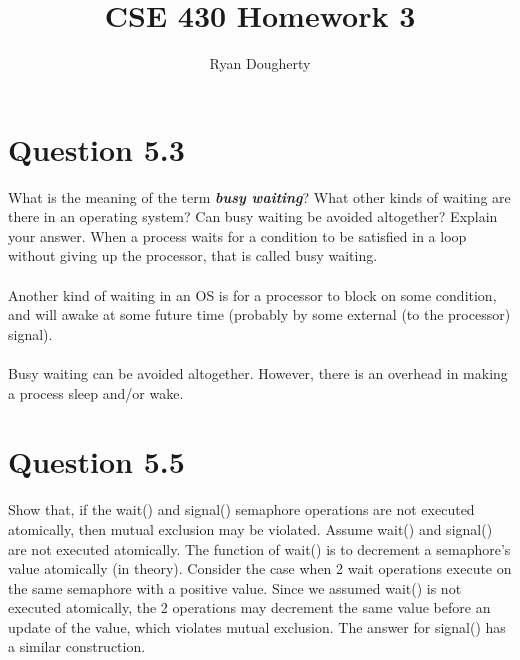 \documentclass[12pt]{article}
\title{CSE 430 Homework 3}
\author{Ryan Dougherty}
\date{}                                           %
\begin{document}
\maketitle

\section*{Question 5.3} {\color{blue}What is the meaning of the term \textbf{\emph{busy waiting}}? What other kinds of waiting are there in an operating system? Can busy waiting be avoided altogether? Explain your answer.} 
When a process waits for a condition to be satisﬁed in a loop without giving up the processor, that is called busy waiting.
\\ \\
Another kind of waiting in an OS is for a processor to block on some condition, and will awake at some future time (probably by some external (to the processor) signal).
\\ \\
Busy waiting can be avoided altogether. However, there is an overhead in making a process sleep and/or wake.

\section*{Question 5.5} {\color{blue}Show that, if the wait() and signal() semaphore operations are not executed atomically, then mutual exclusion may be violated.} 
Assume wait() and signal() are not executed atomically. The function of wait() is to decrement a semaphore's value atomically (in theory). Consider the case when 2 wait operations execute on the same semaphore with a positive value. Since we assumed wait() is not executed atomically, the 2 operations may decrement the same value before an update of the value, which violates mutual exclusion. The answer for signal() has a similar construction.
\end{document}
